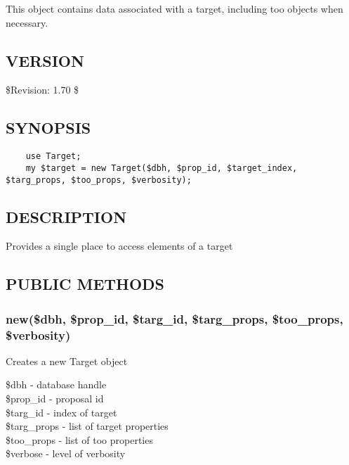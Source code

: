 \documentclass{article}
\begin{document}
This object contains data associated with a target,
including too objects when necessary.

\subsection*{VERSION\label{Target_VERSION}}


\$Revision: 1.70 \$

\subsection*{SYNOPSIS\label{Target_SYNOPSIS}}
\begin{verbatim}
    use Target;
    my $target = new Target($dbh, $prop_id, $target_index, $targ_props, $too_props, $verbosity);
\end{verbatim}
\subsection*{DESCRIPTION\label{Target_DESCRIPTION}}


Provides a single place to access elements of a target

\subsection*{PUBLIC METHODS\label{Target_PUBLIC_METHODS}}
\subsubsection*{new(\$dbh, \$prop\_id, \$targ\_id, \$targ\_props, \$too\_props, \$verbosity)\label{Target_new_dbh_prop_id_targ_id_targ_props_too_props_verbosity_}}


Creates a new Target object

\begin{description}

\item[{\$dbh - database handle}] \mbox{}
\item[{\$prop\_id - proposal id}] \mbox{}
\item[{\$targ\_id - index of target}] \mbox{}
\item[{\$targ\_props - list of target properties}] \mbox{}
\item[{\$too\_props - list of too properties}] \mbox{}
\item[{\$verbose - level of verbosity}] \mbox{}\end{description}
\end{document}
